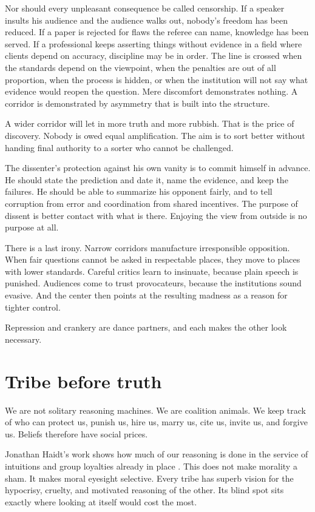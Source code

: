 \documentclass[12pt,a4paper]{book}
\begin{document}
Nor should every unpleasant consequence be called censorship. If a speaker insults his audience and the audience walks out, nobody's freedom has been reduced. If a paper is rejected for flaws the referee can name, knowledge has been served. If a professional keeps asserting things without evidence in a field where clients depend on accuracy, discipline may be in order. The line is crossed when the standards depend on the viewpoint, when the penalties are out of all proportion, when the process is hidden, or when the institution will not say what evidence would reopen the question. Mere discomfort demonstrates nothing. A corridor is demonstrated by asymmetry that is built into the structure.

A wider corridor will let in more truth and more rubbish. That is the price of discovery. Nobody is owed equal amplification. The aim is to sort better without handing final authority to a sorter who cannot be challenged.

The dissenter's protection against his own vanity is to commit himself in advance. He should state the prediction and date it, name the evidence, and keep the failures. He should be able to summarize his opponent fairly, and to tell corruption from error and coordination from shared incentives. The purpose of dissent is better contact with what is there. Enjoying the view from outside is no purpose at all.

There is a last irony. Narrow corridors manufacture irresponsible opposition. When fair questions cannot be asked in respectable places, they move to places with lower standards. Careful critics learn to insinuate, because plain speech is punished. Audiences come to trust provocateurs, because the institutions sound evasive. And the center then points at the resulting madness as a reason for tighter control.

Repression and crankery are dance partners, and each makes the other look necessary.

\section{Tribe before truth}

We are not solitary reasoning machines. We are coalition animals. We keep track of who can protect us, punish us, hire us, marry us, cite us, invite us, and forgive us. Beliefs therefore have social prices.

Jonathan Haidt's work shows how much of our reasoning is done in the service of intuitions and group loyalties already in place \cite{Haidt-righteous-mind}. This does not make morality a sham. It makes moral eyesight selective. Every tribe has superb vision for the hypocrisy, cruelty, and motivated reasoning of the other. Its blind spot sits exactly where looking at itself would cost the most.
\end{document}
